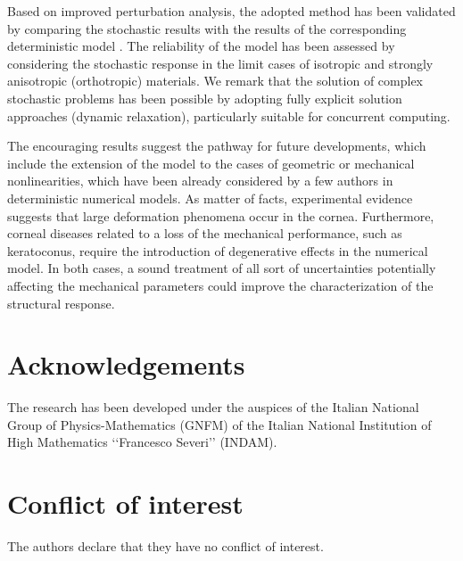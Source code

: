 \documentclass[preprint,12pt]{elsarticle}
\begin{document}
Based on improved perturbation analysis, the adopted method has been validated by comparing the stochastic results with the results of the corresponding deterministic model \cite{pandolfi:2019}. The reliability of the model has been assessed by considering the stochastic response in the limit cases of isotropic and strongly anisotropic (orthotropic) materials. We remark that the solution of complex stochastic problems has been possible by adopting fully explicit solution approaches (dynamic relaxation), particularly suitable for concurrent computing. 

The encouraging results suggest the pathway for future developments, which include the extension of the model to the cases of geometric or mechanical nonlinearities, which have been already considered by a few authors in deterministic numerical models. As matter of facts, experimental evidence suggests that large deformation phenomena occur in the cornea. Furthermore, corneal diseases related to a loss of the mechanical performance, such as keratoconus, require the introduction of degenerative effects in the numerical model. In both cases, a sound treatment of all sort of uncertainties potentially affecting the mechanical parameters could improve the characterization of the structural response.

\section*{Acknowledgements}
The research has been developed under the auspices of the Italian National Group of Physics-Mathematics (GNFM) of the Italian National Institution of High Mathematics ‘‘Francesco Severi’’ (INDAM).

%
\section*{Conflict of interest}
The authors declare that they have no conflict of interest.

%

\newpage


\end{document}
